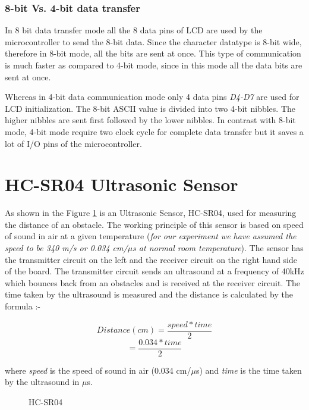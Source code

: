 \documentclass{article}
\begin{document}
\subsubsection{8-bit Vs. 4-bit data transfer}
In 8 bit data transfer mode all the 8 data pins of LCD are used by the microcontroller to send the 8-bit data. Since the character datatype is 8-bit wide, therefore in 8-bit mode, all the bits are sent at once. This type of communication is much faster as compared to 4-bit mode, since in this mode all the data bits are sent at once.


Whereas in 4-bit data communication mode only 4 data pins \emph{D4-D7} are used for LCD initialization. The 8-bit ASCII value is divided into two 4-bit nibbles. The higher nibbles are sent first followed by the lower nibbles. In contrast with 8-bit mode, 4-bit mode require two clock cycle for complete data transfer but it saves a lot of I/O pins of the microcontroller. 

\section{HC-SR04 Ultrasonic Sensor}
As shown in the Figure \ref{fig:ultrsonic sensor} is an Ultrasonic Sensor, HC-SR04, used for measuring the distance of an obstacle. The working principle of this sensor is based on speed of sound in air at a given temperature (\emph{for our experiment we have assumed the speed to be 340 m/s or 0.034 cm/\(\mu\)s at normal room temperature}). The sensor has the transmitter circuit on the left and the receiver circuit on the right hand side of the board. The transmitter circuit sends an ultrasound at a frequency of 40kHz which bounces back from an obstacles and is received at the receiver circuit. The time taken by the ultrasound is measured and the distance is calculated by the formula :-

\[Distance(cm) = \frac{speed * time}{2}\]
\[ = \frac{0.034 * time}{2}\]

\noindent where \emph{speed} is the speed of sound in air (0.034 cm/\(\mu\)s) and \emph{time} is the time taken by the ultrasound in \(\mu\)s.

\begin{figure}[H]
    \centering
    \caption{HC-SR04}
    \label{fig:ultrsonic sensor}
\end{figure}
\end{document}
